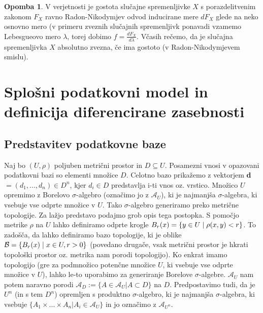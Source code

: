 \documentclass[12pt,a4paper]{amsart}
\theoremstyle{definition} %
\newtheorem{opomba}[definicija]{Opomba}
\theoremstyle{plain} %
\begin{document}
\begin{opomba}
V verjetnosti je gostota slučajne spremenljivke $X$ s porazdelitvenim zakonom $F_X$ ravno Radon-Nikodymjev odvod inducirane mere $dF_X$ glede na neko osnovno mero (v primeru zveznih slučajnih spremenljivk ponavadi vzamemo Lebesgueovo mero $\lambda$, torej dobimo $f=\frac{dF_X}{d \lambda}$. Včasih rečemo, da je slučajna spremenljivka $X$ absolutno zvezna, če ima gostoto (v Radon-Nikodymjevem smislu).
\end{opomba}

\section{Splošni podatkovni model in definicija diferencirane zasebnosti}

\subsection{Predstavitev podatkovne baze}
Naj bo $(U, \rho)$ poljuben metrični prostor in $D \subseteq U$. Posamezni vnosi v opazovani podatkovni bazi so elementi množice $D$. Celotno bazo prikažemo z vektorjem \textbf{d} $= (d_{1}, ..., d_{n}) \in D^n$, kjer $d_{i} \in D$ predstavlja i-ti vnos oz. vrstico. 
\newline
\newline
Množico $U$ opremimo z Borelovo $\sigma$-algebro (označimo jo z $\mathcal{A}_{U}$), ki je najmanjša $\sigma$-algebra, ki vsebuje vse odprte množice v $U$. Tako $\sigma$-algebro generiramo preko metrične topologije. Za lažjo predstavo podajmo grob opis tega postopka. S pomočjo metrike $\rho$ na $U$ lahko definiramo odprte krogle  $B_{r}(x) = \{y \in U\hspace{0.1cm}|\hspace{0.1cm}\rho(x,y) < r\}$. To zadošča, da lahko definiramo bazo topologije, ki je oblike $\mathcal{B} = \{B_{r}(x)\hspace{0.1cm}|\hspace{0.1cm}x \in U, r>0\}$ (povedano drugače, vsak metrični prostor je hkrati topološki prostor oz. metrika nam porodi topologijo). Ko enkrat imamo topologijo  (gre za podmnožico potenčne množice $U$, ki vsebuje vse odprte množice v $U$), lahko le-to uporabimo za generiranje Borelove $\sigma$-algebre.
\newline
\newline
$\mathcal{A}_{U}$ nam potem naravno porodi $\mathcal{A}_{D} := \{A \in \mathcal{A}_{U} | A \subset D \}$ na $D$. Predpostavimo tudi, da je $U^n$ (in s tem $D^n$) opremljen s produktno $\sigma$-algebro, ki je najmanjša $\sigma$-algebra, ki vsebuje $\{A_{1} \times ... \times A_{n} | A_{i} \in \mathcal{A}_{U}\}$ in jo označimo z $\mathcal{A}_{U^n}$. 
\end{document}
